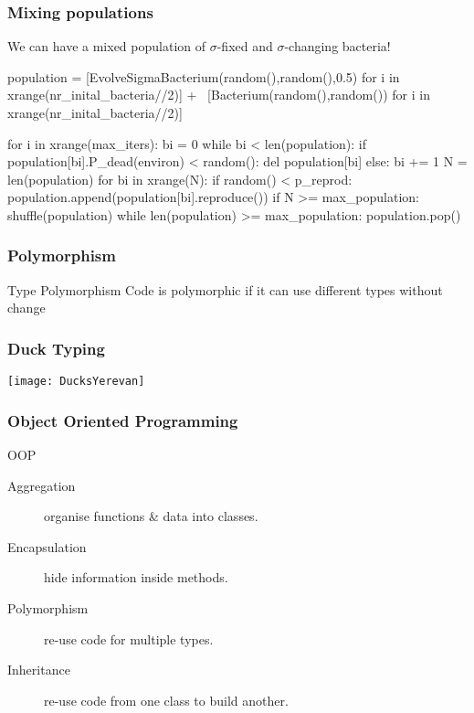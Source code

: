 \begin{frame}[fragile]
\frametitle{Mixing populations}
We can have a mixed population of $\sigma$-fixed and $\sigma$-changing bacteria!
\end{frame}

\begin{frame}[fragile]
\begin{python}
population = [EvolveSigmaBacterium(random(),random(),0.5)
        for i in xrange(nr_inital_bacteria//2)] + \
        [Bacterium(random(),random())
        for i in xrange(nr_inital_bacteria//2)]

for i in xrange(max_iters):
    bi = 0
    while bi < len(population):
        if population[bi].P_dead(environ) < random():
            del population[bi]
        else:
            bi += 1
    N = len(population)
    for bi in xrange(N):
        if random() < p_reprod:
            population.append(population[bi].reproduce())
    if N >= max_population:
        shuffle(population)
        while len(population) >= max_population:
            population.pop()
\end{python}
\end{frame}


\begin{frame}[fragile] 
\frametitle{Polymorphism}

\begin{block}{Type Polymorphism}
Code is \alert{polymorphic} if it can use different types without change
\end{block}
\end{frame}

\begin{frame}[fragile]
\frametitle{Duck Typing}

\centering
\texttt{[image: DucksYerevan]} %

\end{frame}



\begin{frame}[fragile] 
\frametitle{Object Oriented Programming}

\begin{block}{OOP}
\begin{description}
\item[\alert{Aggregation}] organise functions \& data into classes.
\item[\alert{Encapsulation}] hide information inside methods.
\item[\alert{Polymorphism}] re-use code for multiple types.
\item[Inheritance] re-use code from one class to build another.
\end{description}
\end{block}
\end{frame}

